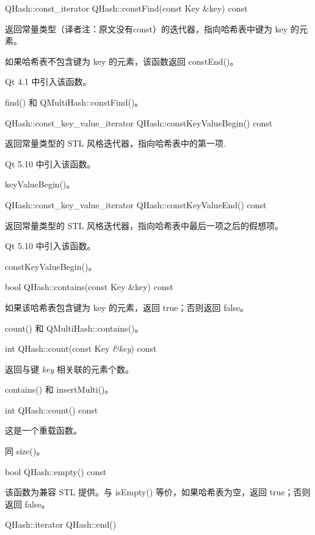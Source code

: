 QHash::const\_iterator QHash::constFind(const Key \&key) const

返回常量类型（译者注：原文没有const）的迭代器，指向哈希表中键为 key 的元素。

如果哈希表不包含键为 key 的元素，该函数返回 constEnd()。

Qt 4.1 中引入该函数。


\begin{notice}[另请参阅]
find() 和 QMultiHash::constFind()。
\end{notice}

QHash::const\_key\_value\_iterator QHash::constKeyValueBegin() const

返回常量类型的 STL 风格迭代器，指向哈希表中的第一项.

Qt 5.10 中引入该函数。

\begin{notice}[另请参阅]
keyValueBegin()。
\end{notice}


QHash::const\_key\_value\_iterator QHash::constKeyValueEnd() const

返回常量类型的 STL 风格迭代器，指向哈希表中最后一项之后的假想项。

Qt 5.10 中引入该函数。

\begin{notice}[另请参阅]
constKeyValueBegin()。
\end{notice}


bool QHash::contains(const Key \&key) const

如果该哈希表包含键为 key 的元素，返回 true；否则返回 false。

\begin{notice}[另请参阅]
count() 和 QMultiHash::contains()。
\end{notice}

int QHash::count(const Key \emph{\&key}) const

返回与键 \emph{key} 相关联的元素个数。

\begin{notice}[另请参阅]
contains() 和 insertMulti()。
\end{notice}

int QHash::count() const

这是一个重载函数。

同 size()。

bool QHash::empty() const

该函数为兼容 STL 提供。与 isEmpty() 等价，如果哈希表为空，返回 true；否则返回 false。

QHash::iterator QHash::end()

